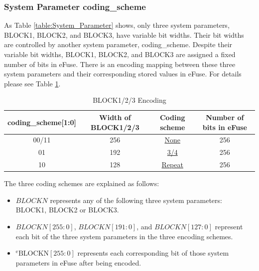 \documentclass[main\_\_EN.tex]{subfiles}
\begin{document}
\subsubsection{System Parameter coding\_scheme}

As Table \ref{table:System_Parameter} shows, only three system parameters, BLOCK1, BLOCK2, and BLOCK3, have variable bit widths.
Their bit widths are controlled by another system parameter, coding\_scheme. Despite their variable bit widths, BLOCK1, BLOCK2, and BLOCK3 are assigned a fixed number of bits in eFuse. There is an encoding mapping between these three system parameters and their corresponding stored values in eFuse. For details please see Table \ref{table:BLOCKN_Encode}.

\begin{longtable}[c]{|c|c|c|c|}
    \caption{BLOCK1/2/3 Encoding}
    \label{table:BLOCKN_Encode}
        \\\hline
        \rowcolor{lightgray}
        coding\_scheme[1:0] & Width of BLOCK1/2/3 & Coding scheme & Number of bits in eFuse \\
        \hline
        00/11 & 256 & \hyperlink{None}{None} & 256 \\
        \hline
        01 & 192 & \hyperlink{frac_3_4}{3/4} & 256 \\
        \hline
        10 & 128 & \hyperlink{Repeat}{Repeat} & 256 \\
        \hline
\end{longtable}


The three coding schemes are explained as follows:
\begin{itemize}
\item \begin{math}BLOCKN\end{math} represents any of the following three system parameters: BLOCK1, BLOCK2 or BLOCK3.
\item
\begin{math}BLOCKN[255:0]\end{math},
\begin{math}BLOCKN[191:0]\end{math}, and
\begin{math}BLOCKN[127:0]\end{math} represent each bit of the three system parameters in the three encoding schemes.
\item
\begin{math}{}^{\mathrm{e}}\mathrm{BLOCKN}[255\!:\!0]\end{math} represents each corresponding bit of those system parameters in eFuse after being encoded.
\end{itemize}
\end{document}
